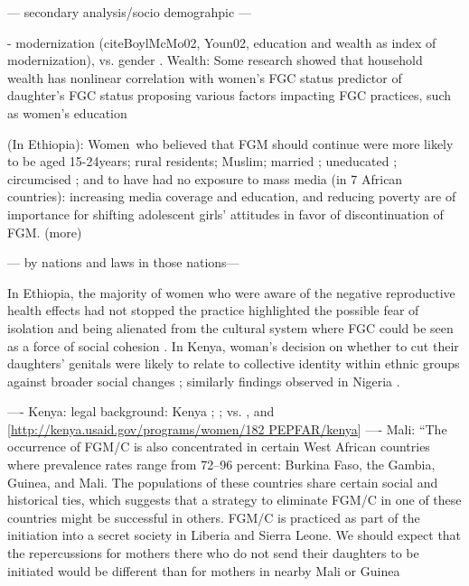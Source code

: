 \documentclass[12pt,]{article}
\begin{document}
{— secondary analysis/socio demograhpic —

- modernization (cite{BoylMcMo02, Youn02}, education and wealth as index of modernization), vs. gender \cite{Dell04, FrieMahm13, Lewi04, Meye00, Njam04, YirgKass12, Youn02}. 
   Wealth:  Some research showed that household wealth has nonlinear correlation with women's FGC status predictor of daughter's FGC status
\cite{KandNwak09,VanMeek15} proposing various factors impacting FGC practices, such as women's education 

\cite{MashMatt09} (In Ethiopia):  Women who believed that FGM should continue were more likely to be aged 15-24years; rural residents; Muslim; married ; uneducated ; circumcised ; and to have had no exposure to mass media
\cite{DalaKalm18}(in 7 African countries): increasing media coverage and education, and reducing poverty are of importance for shifting adolescent girls' attitudes in favor of discontinuation of FGM.
\cite{Hayf05, PashPonn16} (more)

— by nations and laws in those nations—


In Ethiopia, the majority of women who were aware of the negative reproductive health effects had not stopped the practice highlighted the possible fear of isolation and being alienated from the cultural system where FGC could be seen as a force of social cohesion \cite{YirgKass12}.  In Kenya, woman's decision on whether to cut their daughters' genitals were likely to relate to collective identity within ethnic groups against broader social changes \cite{Achi14, Hayf05}; similarly findings observed in Nigeria \cite{FreyJohn07, KandMwek09}.


---- Kenya: legal background:  Kenya \cite{GKEN01}; \cite{UNIC13}; 
 vs. \cite{Chia14, Hayf05}, and [\url{http://kenya.usaid.gov/programs/women/182 PEPFAR/kenya}]
---- Mali: ``The occurrence of FGM/C is also concentrated in certain West African countries where prevalence rates range from 72–96 percent: Burkina Faso, the Gambia, Guinea, and Mali. The populations of these countries share certain social and historical ties, which suggests that a strategy to eliminate FGM/C in one of these countries might be successful in others. FGM/C is practiced as part of the initiation into a secret society in Liberia and Sierra Leone. We should expect that the repercussions for mothers there who do not send their daughters to be initiated would be different than for mothers in nearby Mali or Guinea \cite{YodaWang13}

}
\end{document}
